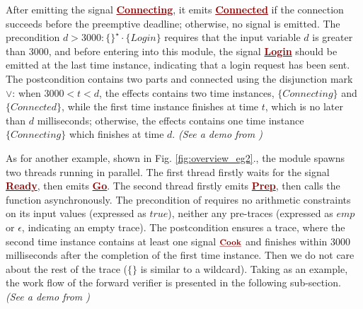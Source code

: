 \documentclass[acmsmall,review,anonymous]{acmart}\settopmatter{printfolios=true,printccs=false,printacmref=false}
\newcommand{\anyevent}[1]{{\textcolor{darkred}
{\underline{\textbf{\footnotesize #1}}}}}
\newcommand{\code}[1]{{\tt{\ensuremath{\m{#1}}}}}
\newcommand{\m}{\mathit}
\newcommand\figref[1]{Fig. \textcolor{black}{\ref{#1}}.}
\begin{document}
After emitting the signal \anyevent{Connecting}, it emits  \anyevent{Connected} if the connection succeeds before the  preemptive deadline; otherwise, no signal is emitted. 
The precondition \code{d{>}3000 : \{
\}^\star \cdot\{\m{Login}\} } requires that the input variable \code{d} is greater than 3000, and before entering into this module, the signal \anyevent{Login} should be emitted at the last time instance, indicating that a login request has been sent. 
The postcondition contains two parts and connected using the disjunction mark \code{{\vee}}: when \code{3000{<}t{<}d}, the effects contains two time instances, \code{\{\m{Connecting}\}} and \code{\{\m{Connected}\}}, while the first  time instance finishes at time \code{t}, %
which is no later than \code{\m{d}} milliseconds; otherwise, the effects contains one time instance \code{\{Connecting\}} which finishes at time \code{d}. \emph{(See a demo from \cite{CODE1})}



As for another example, shown in \figref{fig:overview_eg2}, the module {} %
spawns two threads running in  parallel.
The first thread firstly waits for the signal \anyevent{Ready}, then emits  \anyevent{Go}. 
The second thread firstly emits  \anyevent{Prep}, then calls the function {} asynchronously. 
The precondition of {} requires no arithmetic constraints on its input values (expressed as \code{\m{true}}), neither any pre-traces  (expressed as \code{\m{emp}} or \code{\epsilon}, indicating an empty trace). The postcondition ensures a trace, where the second time instance contains at least one signal \code{\anyevent{Cook}} and finishes within 3000 milliseconds after the completion of the first time instance. Then we do not care about the rest of the trace (\code{\{\}} is similar to a wildcard). 
Taking {} as an example, the work flow of the forward verifier is presented in the following sub-section. \emph{(See a demo from \cite{CODE2})}
\end{document}

